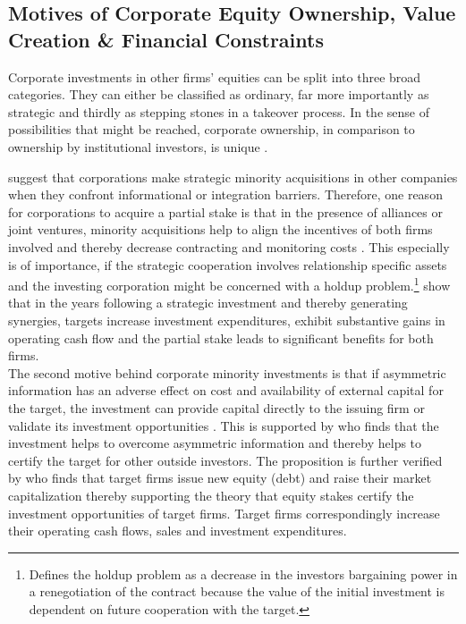 \documentclass[12pt]{article}
\begin{document}
\subsection{Motives of Corporate Equity Ownership, Value Creation \& Financial Constraints}

\noindent Corporate investments in other firms' equities can be split into three broad categories. They can either be classified as ordinary, far more importantly as strategic and thirdly as stepping stones in a takeover process. 
In the sense of possibilities that might be reached, corporate ownership, in comparison to ownership by institutional investors, is unique \citep[p.2791]{Allen2000}.

\citet[p.1]{Huang2017} suggest that corporations make strategic minority acquisitions in other companies when they confront informational or integration barriers. 
Therefore, one reason for corporations to acquire a partial stake is that in the presence of alliances or joint ventures, minority acquisitions help to align the incentives of both firms involved and thereby decrease contracting and monitoring costs \citep[p.2792]{Allen2000}. This especially is of importance, if the strategic cooperation involves relationship specific assets and the investing corporation might be concerned with a holdup problem.\footnote{\citet[p.1023]{Ouimet2013} Defines the holdup problem as a decrease in the investors bargaining power in a renegotiation of the contract because the value of the initial investment is dependent on future cooperation with the target.} \citet[p. 2793]{Allen2000} show that in the years following a strategic investment and thereby generating synergies,  targets increase investment expenditures, exhibit substantive gains in operating cash flow and the partial stake leads to significant benefits for both firms.\\
The second motive behind corporate minority investments is that if asymmetric information has an adverse effect on cost and availability of external capital for the target, the investment can provide capital directly to the issuing firm or validate its investment opportunities \citep[p.2792]{Allen2000}. This is supported by \citet[p.1038]{Ouimet2013} who finds that the investment helps to overcome asymmetric information and thereby helps to certify the target for other outside investors. The proposition is further verified by \citet[p.78]{Liao2014} who finds that target firms issue new equity (debt) and raise their market capitalization thereby supporting the theory that equity stakes certify the investment opportunities of target firms. Target firms correspondingly increase their operating cash flows, sales and investment expenditures.\\ 
\end{document}

